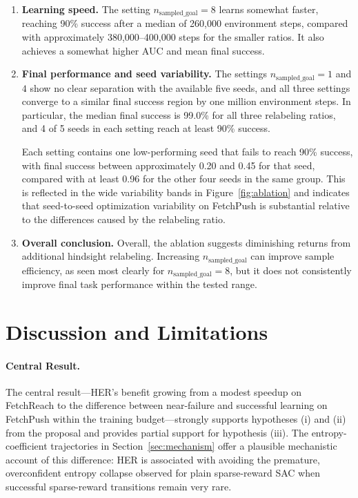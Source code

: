 \documentclass{article}
\begin{document}
\begin{enumerate}
    \item \textbf{Learning speed.}
    The setting $n_{\text{sampled\_goal}}=8$ learns somewhat faster, reaching
    90\% success after a median of 260,000 environment steps, compared with
    approximately 380,000--400,000 steps for the smaller ratios. It also
    achieves a somewhat higher AUC and mean final success.

    \item \textbf{Final performance and seed variability.}
    The settings $n_{\text{sampled\_goal}}=1$ and $4$ show no clear separation
    with the available five seeds, and all three settings converge to a similar
    final success region by one million environment steps. In particular, the
    median final success is 99.0\% for all three relabeling ratios, and 4 of 5
    seeds in each setting reach at least 90\% success.

    Each setting contains one low-performing seed that fails to reach 90\%
    success, with final success between approximately 0.20 and 0.45 for that
    seed, compared with at least 0.96 for the other four seeds in the same
    group. This is reflected in the wide variability bands in
    Figure~\ref{fig:ablation} and indicates that seed-to-seed optimization
    variability on FetchPush is substantial relative to the differences caused
    by the relabeling ratio.

    \item \textbf{Overall conclusion.}
    Overall, the ablation suggests diminishing returns from additional hindsight
    relabeling. Increasing $n_{\text{sampled\_goal}}$ can improve sample
    efficiency, as seen most clearly for $n_{\text{sampled\_goal}}=8$, but it
    does not consistently improve final task performance within the tested range.
\end{enumerate}

\section{Discussion and Limitations}
\label{sec:discussion}

\paragraph{Central Result.}
The central result---HER's benefit growing from a modest speedup on FetchReach
to the difference between near-failure and successful learning on FetchPush
within the training budget---strongly supports hypotheses (i) and (ii) from the
proposal and provides partial support for hypothesis (iii). The entropy-coefficient
trajectories in Section~\ref{sec:mechanism} offer a plausible mechanistic account
of this difference: HER is associated with avoiding the premature, overconfident
entropy collapse observed for plain sparse-reward SAC when successful
sparse-reward transitions remain very rare.
\end{document}
